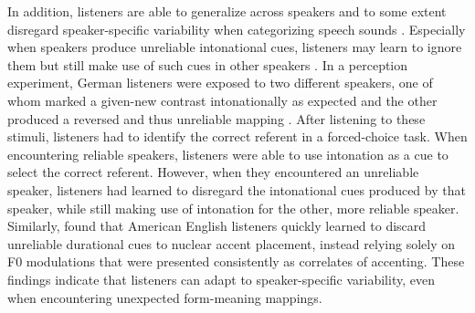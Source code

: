 In addition, listeners are able to generalize across speakers and to some extent disregard speaker-specific variability when categorizing speech sounds \citep{kriengwatanaGeneralAuditoryBias2015, roettgerEvidentialStrengthIntonational2019}. Especially when speakers produce unreliable intonational cues, listeners may learn to ignore them but still make use of such cues in other speakers \citep{roettgerListenersAdaptationUnreliable2020}. In a perception experiment, German listeners were exposed to two different speakers, one of whom marked a given-new contrast intonationally as expected and the other produced a reversed and thus unreliable mapping \citep{roettgerListenersAdaptationUnreliable2020}. After listening to these stimuli, listeners had to identify the correct referent in a forced-choice task. When encountering reliable speakers, listeners were able to use intonation as a cue to select the correct referent. However, when they encountered an unreliable speaker, listeners had learned to disregard the intonational cues produced by that speaker, while still making use of intonation for the other, more reliable speaker. Similarly, \citet{jasminShorttermPerceptualReweighting2022} found that American English listeners quickly learned to discard unreliable durational cues to nuclear accent placement, instead relying solely on F0 modulations that were presented consistently as correlates of accenting. These findings indicate that listeners can adapt to speaker-specific variability, even when encountering unexpected form-meaning mappings.

